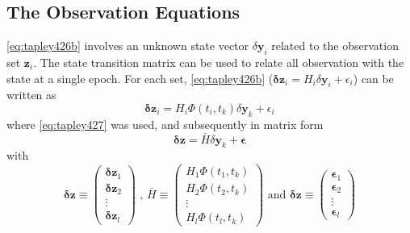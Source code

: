 \subsection{The Observation Equations}\label{ssec:pod-observation-equations}

\autoref{eq:tapley426b} involves an unknown state vector $\delta \bm{y}_i$ related 
to the observation set $\bm{z}_i$. The state transition matrix can be used to relate 
all observation with the state at a single epoch. For each set, \autoref{eq:tapley426b} 
($\bm{\delta z}_i = H_i \delta \bm{y}_i + \epsilon _i$) can be written as 
\begin{equation}\label{eq:tapley4237}
    \bm{\delta z}_i = H_i \Phi (t_i,t_k) \delta \bm{y}_k + \epsilon _i
\end{equation}
where \autoref{eq:tapley427} was used, and subsequently in matrix form 
\begin{equation}\label{eq:tapley4239}
    \bm{\delta z} = \bar{H} \delta \bm{y}_k + \bm{\epsilon}
\end{equation}
with
\begin{equation}
    \bm{\delta z} \equiv \begin{pmatrix}\bm{\delta z}_1 \\ \bm{\delta z}_2 \\ \vdots \\ \bm{\delta z}_l \end{pmatrix} 
    \text{ , }
    \bar{H} \equiv \begin{pmatrix}H_1 \Phi (t_1,t_k) \\ H_2 \Phi (t_2,t_k) \\ \vdots \\ H_l \Phi (t_l,t_k)\end{pmatrix} 
    \text{ and }
    \bm{\delta z} \equiv \begin{pmatrix}\bm{\epsilon}_1 \\ \bm{\epsilon}_2 \\ \vdots \\ \bm{\epsilon}_l \end{pmatrix} 
\end{equation}
